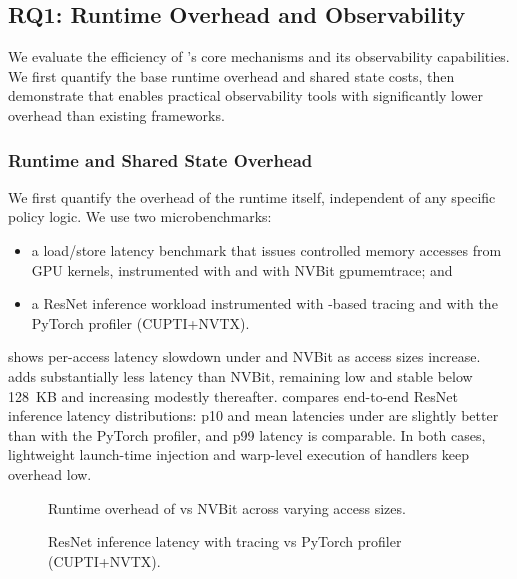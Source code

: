 \subsection{RQ1: Runtime Overhead and Observability}

We evaluate the efficiency of \sys's core mechanisms and its observability
capabilities. We first quantify the base runtime overhead and shared state costs,
then demonstrate that \sys enables practical observability tools with
significantly lower overhead than existing frameworks.

\subsubsection{Runtime and Shared State Overhead}

We first quantify the overhead of the \sys runtime itself, independent of any
specific policy logic. We use two microbenchmarks:

\begin{itemize}[leftmargin=*]
  \item a load/store latency benchmark that issues controlled memory accesses
        from GPU kernels, instrumented with \sys and with NVBit gpumemtrace; and
  \item a ResNet inference workload instrumented with \sys-based tracing and
        with the PyTorch profiler (CUPTI+NVTX).
\end{itemize}

 shows per-access latency slowdown under
\sys and NVBit as access sizes increase. \sys adds substantially less latency
than NVBit, remaining low and stable below 128~KB and increasing modestly
thereafter.  compares end-to-end ResNet inference
latency distributions: p10 and mean latencies under \sys are slightly better
than with the PyTorch profiler, and p99 latency is comparable. In both cases,
lightweight launch-time injection and warp-level execution of \sys handlers
keep overhead low.

\begin{figure}
\centering
{}
\caption{Runtime overhead of \sys vs NVBit across varying access sizes.}
\label{fig:runtime-overhead}
\end{figure}

\begin{figure}
\centering
{}
\caption{ResNet inference latency with \sys tracing vs PyTorch profiler (CUPTI+NVTX).}
\label{fig:resnet-latency}
\end{figure}

